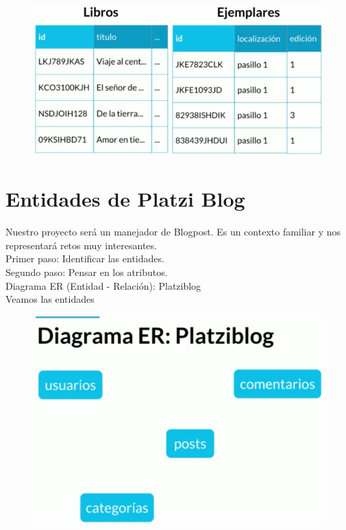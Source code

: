\documentclass{article}
\begin{document}
\begin{figure}[h!]
    \centering
      \includegraphics[scale=0.5]{./Pictures/007_enditad_debil_existencia.png}
\end{figure}


\section{Entidades de Platzi Blog}%
Nuestro proyecto será un manejador de Blogpost. Es un contexto familiar y nos
representará retos muy interesantes.\\

Primer paso: Identificar las entidades.\\
Segundo paso: Pensar en los atributos.\\

Diagrama ER (Entidad - Relación): Platziblog\\

Veamos las entidades
\begin{figure}[h!]
    \centering
      \includegraphics[scale=0.45]{./Pictures/008_Diagrama.png}
\end{figure}
\end{document}
